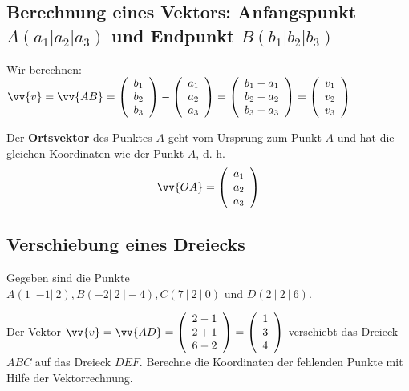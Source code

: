 \subsection{Berechnung eines Vektors: Anfangspunkt $A(a_1|a_2|a_3)$ und Endpunkt $B(b_1|b_2|b_3)$}

Wir berechnen: $\vv{v} = \vv{AB} = \left(\begin{array}{c} b_1 \\ b_2 \\ b_3 \end{array}\right) - \left(\begin{array}{c} a_1 \\ a_2 \\ a_3 \end{array}\right) = \left(\begin{array}{c} b_1 - a_1 \\ b_2 - a_2 \\ b_3 - a_3 \end{array}\right) = \left(\begin{array}{c} v_1 \\ v_2 \\ v_3 \end{array}\right)$

\begin{definition}
    Der \textbf{Ortsvektor} des Punktes $A$ geht vom Ursprung zum Punkt $A$ und hat die gleichen Koordinaten wie der Punkt $A$, d. h. $$\vv{OA} = \left(\begin{array}{c} a_1 \\ a_2 \\ a_3 \end{array}\right)$$
\end{definition}

\subsection{Verschiebung eines Dreiecks}

Gegeben sind die Punkte $A(1 \ |-1| \ 2), B(-2| \ 2 \ |-4), C(7 \ | \ 2 \ | \ 0) \text{ und } D(2 \ | \ 2 \ | \ 6)$.

Der Vektor $\vv{v} = \vv{AD} = \left(\begin{array}{c} 2 - 1 \\ 2 + 1 \\ 6 - 2 \end{array}\right) = \left(\begin{array}{c} 1 \\ 3 \\ 4 \end{array}\right)$ verschiebt das Dreieck $ABC$ auf das Dreieck $DEF$. Berechne die Koordinaten der fehlenden Punkte mit Hilfe der Vektorrechnung.

